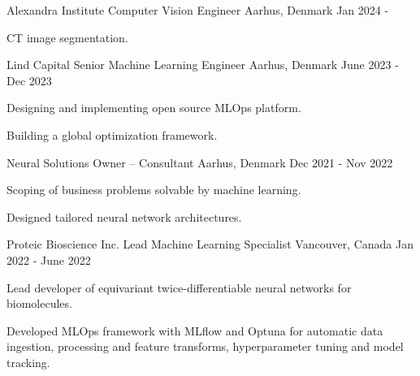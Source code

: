 \begin{cventries}
\vspace{5mm}

  \cventry
  {Alexandra Institute} %
  {Computer Vision Engineer} %
    {Aarhus, Denmark} %
    {Jan 2024 - } %
    {
      \begin{cvitems} %
        \item {CT image segmentation.}
      \end{cvitems}
    }


  \cventry
  {Lind Capital} %
  {Senior Machine Learning Engineer} %
    {Aarhus, Denmark} %
    {June 2023 - Dec 2023} %
    {
      \begin{cvitems} %
        \item {Designing and implementing open source MLOps platform.}
        \item {Building a global optimization framework.}
      \end{cvitems}
    }


  \cventry
  {Neural Solutions} %
  {Owner -- Consultant} %
    {Aarhus, Denmark} %
    {Dec 2021 - Nov 2022} %
    {
      \begin{cvitems} %
        \item {Scoping of business problems solvable by machine learning.}
        \item {Designed tailored neural network architectures.}
      \end{cvitems}
    }


  \cventry
  {Proteic Bioscience Inc.} %
  {Lead Machine Learning Specialist} %
    {Vancouver, Canada} %
    {Jan 2022 - June 2022} %
    {
      \begin{cvitems} %
        \item {Lead developer of equivariant twice-differentiable neural networks for biomolecules.}
        \item {Developed MLOps framework with MLflow and Optuna for automatic data ingestion, processing and feature transforms, hyperparameter tuning and model tracking.}
      \end{cvitems}
    }


\end{cventries}
